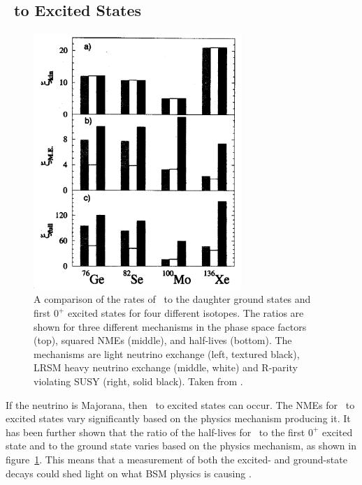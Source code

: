 \documentclass[/main.tex]{subfiles}
\begin{document}
\subsection{\znbb\ to Excited States}
\begin{figure}[t]
  \centering
  \includegraphics[width=0.7\textwidth]{esmechanismratio}
  \caption[]{\label{fig:esmechanism}
    A comparison of the rates of \znbb\ to the daughter ground states and first $0^+$ excited states for four different isotopes. The ratios are shown for three different mechanisms in the phase space factors (top), squared NMEs (middle), and half-lives (bottom). The mechanisms are light neutrino exchange (left, textured black), LRSM heavy neutrino exchange (middle, white) and R-parity violating SUSY (right, solid black). Taken from \cite{Simkovic2002}.
  }
\end{figure}
If the neutrino is Majorana, then \znbb\ to excited states can occur.
The NMEs for \znbb\ to excited states vary significantly based on the physics mechanism producing it.
It has been further shown that the ratio of the half-lives for \znbb\ to the first $0^+$ excited state and to the ground state varies based on the physics mechanism, as shown in figure~\ref{fig:esmechanism}\cite{Simkovic2002, Suhonen2016}.
This means that a measurement of both the excited- and ground-state decays could shed light on what BSM physics is causing \znbb.
\end{document}
